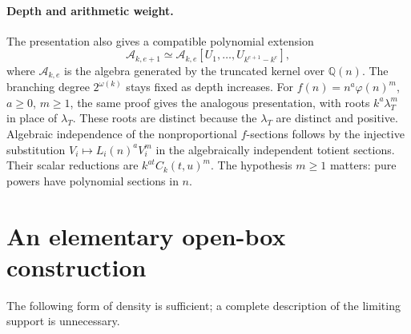 \documentclass[11pt,a4paper]{article}
\theoremstyle{definition}\newtheorem{definition}[theorem]{Definition}
\theoremstyle{remark}\newtheorem{remark}[theorem]{Remark}
\newcommand{\Q}{\mathbb Q}\newcommand{\R}{\mathbb R}\newcommand{\Z}{\mathbb Z}\newcommand{\N}{\mathbb N}
\newcommand{\ph}{\varphi}\newcommand{\rad}{\operatorname{rad}}
\begin{document}
\paragraph{Depth and arithmetic weight.}
The presentation also gives a compatible polynomial extension
\[
 \mathcal A_{k,e+1}\simeq
 \mathcal A_{k,e}[U_1,\ldots,U_{k^{e+1}-k^e}],
\]
where $\mathcal A_{k,e}$ is the algebra generated by the truncated kernel over
$\Q(n)$. The branching degree $2^{\omega(k)}$ stays fixed as depth increases.
For $f(n)=n^a\ph(n)^m$, $a\ge0$, $m\ge1$, the same proof gives the analogous
presentation, with roots $k^a\lambda_T^m$ in place of $\lambda_T$.
These roots are distinct because the $\lambda_T$ are distinct and positive.
Algebraic independence of the nonproportional $f$-sections follows by the
injective substitution $V_i\mapsto L_i(n)^a V_i^m$ in the algebraically
independent totient sections. Their scalar reductions are $k^{at}C_k(t,u)^m$.
The hypothesis $m\ge1$ matters: pure powers have polynomial sections in $n$.

\section{An elementary open-box construction}\label{sec:box}
The following form of density is sufficient; a complete description of the
limiting support is unnecessary.
\end{document}
